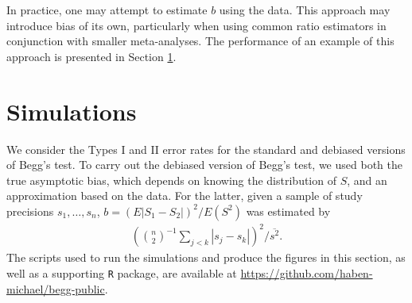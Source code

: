 \documentclass[12pt]{article}
\newcommand{\E}{E}
\newcommand{\biasratio}{b}%
\newcommand{\s}{S}
\begin{document}
  In practice, one may attempt to estimate $\biasratio$ using the
  data. This approach may introduce bias of its own, particularly when
  using common ratio estimators in conjunction with  smaller
  meta-analyses. The performance of an example of this approach is presented in Section \ref{section:simulations}.

  
\section{Simulations}
\label{section:simulations}
  We consider the Types I and II error rates for the standard and 
  debiased versions of Begg's test. To carry out the debiased version
  of Begg's test, we used both the true asymptotic bias, which depends
  on knowing the distribution of $\s$, and an approximation based on the
  data. For the latter, given a sample of study precisions
  $s_1,\ldots,s_n$, $\biasratio=(\E|\s_1-\s_2|)^2/E(\s^2)$ was estimated
  by
    \begin{align}
      \left({n\choose 2}^{-1}\sum_{j<k}|s_j-s_k|\right)^2\bigg/ \overline{s^2}.
    \end{align}
      The scripts used to run the simulations and produce the figures
      in this section, as well as a supporting \texttt{R} package, are available at \url{https://github.com/haben-michael/begg-public}.
\end{document}
